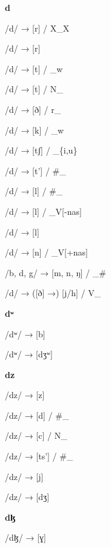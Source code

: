 \begin{center}\textbf{d}\end{center}
\begin{multicols}{4}
\noindent /d/ → [r] / X\_X

\noindent /d/ → [r]

\noindent /d/ → [t] / \_w

\noindent /d/ → [t] / N\_

\noindent /d/ → [ð] / r\_

\noindent /d/ → [k] / \_w

\noindent /d/ → [tʃ] / \_\{i,u\}

\noindent /d/ → [t'] / \#\_

\noindent /d/ → [l] / \#\_

\noindent /d/ → [l] / \_V[-nas]

\noindent /d/ → [l]

\noindent /d/ → [n] / \_V[+nas]

\noindent /b, d, g/ → [m, n, ŋ] / \_\#

\noindent /d/ → ([ð] →) [j/h] / V\_
\end{multicols}


\begin{center}\textbf{dʷ}\end{center}
\begin{multicols}{4}
\noindent /dʷ/ → [b]

\noindent /dʷ/ → [dʒʷ]
\end{multicols}


\begin{center}\textbf{dz}\end{center}
\begin{multicols}{4}
\noindent /dz/ → [z]

\noindent /dz/ → [d] / \#\_

\noindent /dz/ → [c] / N\_

\noindent /dz/ → [ts'] / \#\_

\noindent /dz/ → [j]

\noindent /dz/ → [dʒ]

\end{multicols}

\begin{center}\textbf{dɮ}\end{center}
\begin{multicols}{4}
\noindent /dɮ/ → [ɣ]
\end{multicols}

